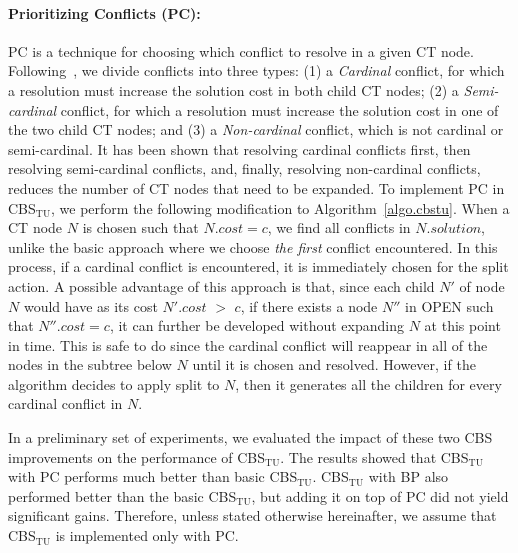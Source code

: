 \documentclass[jair,twoside,11pt,theapa]{article}
\newcommand{\cbstu}{CBS$\mathrm{_{TU}}$\xspace}
\begin{document}
\paragraph{Prioritizing Conflicts (PC):}
PC is a technique for choosing which conflict to resolve in a given CT node. %
Following~, we divide conflicts into three types: (1) a \emph{Cardinal} conflict, for which a resolution must increase the solution cost in both child CT nodes; (2) a \emph{Semi-cardinal} conflict, for which a resolution must increase the solution cost in one of the two child CT nodes; and (3) a \emph{Non-cardinal} conflict, which is not cardinal or semi-cardinal. It has been shown that resolving cardinal conflicts first, then resolving semi-cardinal conflicts, and, finally, resolving non-cardinal conflicts, reduces the number of CT nodes that need to be expanded. 
To implement PC in \cbstu, we perform the following modification to Algorithm~\ref{algo.cbstu}. 
When a CT node $N$ is chosen such that $N.cost = c$, we find all conflicts in $N.solution$, unlike the basic approach where we choose \emph{the first} conflict encountered. %
In this process, if a cardinal conflict is encountered, it is immediately chosen for the split action. 
A possible advantage of this approach is that, since each child $N'$ of node $N$ would have as its cost $N'.cost$ $>$ $c$, if there exists a node $N''$ in OPEN such that $N''.cost = c$, it can further be developed without expanding $N$ at this point in time. This is safe to do since the cardinal conflict will reappear in all of the nodes in the subtree below $N$ until it is chosen and resolved. However, if the algorithm decides to apply split to $N$, then it generates all the children for every cardinal conflict in $N$. 


In a preliminary set of experiments, we evaluated the impact of these two CBS improvements on the performance of \cbstu. 
The results showed that \cbstu with PC performs much better than basic \cbstu. 
\cbstu with BP also performed better than the basic \cbstu, but adding it on top of PC did not yield significant gains. 
Therefore, unless stated otherwise hereinafter, we assume that \cbstu is implemented only with PC. %
\end{document}
